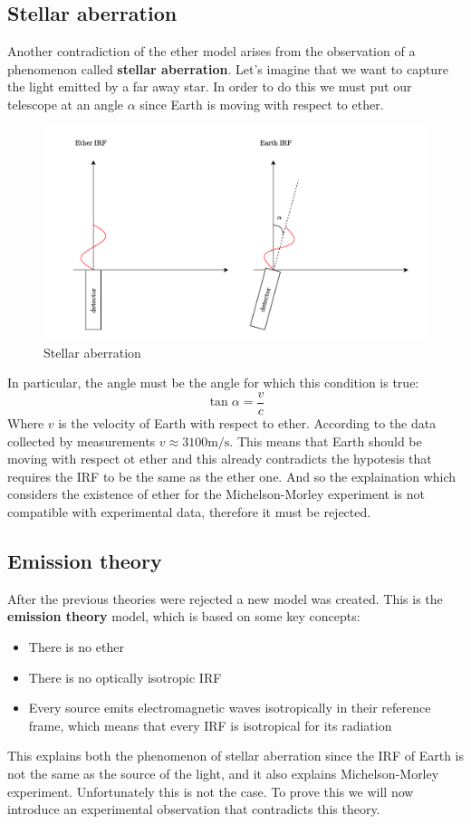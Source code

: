 \subsection{Stellar aberration}
Another contradiction of the ether model arises from the observation of a phenomenon called \textbf{stellar aberration}. Let's imagine that we want to capture the light emitted by a far away star. In order to do this we must put our telescope at an angle $\alpha$ since Earth is moving with respect to ether.
\begin{figure}[H]
  \centering
  \includegraphics[width=0.6\linewidth]{res/svg/stellar_aberration.drawio}
  \caption{Stellar aberration}
\end{figure}
In particular, the angle must be the angle for which this condition is true:
\begin{equation}
  \tan \alpha = \dfrac{v}{c}
\end{equation}
Where $v$ is the velocity of Earth with respect to ether. According to the data collected by measurements $v \approx 3100 \unit{\meter / \second}$. This means that Earth should be moving with respect ot ether and this already contradicts the hypotesis that requires the IRF to be the same as the ether one. And so the explaination which considers the existence of ether for the Michelson-Morley experiment is not compatible with experimental data, therefore it must be rejected.
\subsection{Emission theory}
After the previous theories were rejected a new model was created. This is the \textbf{emission theory} model, which is based on some key concepts:
\begin{itemize}
  \item There is no ether
  \item There is no optically isotropic IRF
  \item Every source emits electromagnetic waves isotropically in their reference frame, which means that every IRF is isotropical for its radiation
\end{itemize}
This explains both the phenomenon of stellar aberration since the IRF of Earth is not the same as the source of the light, and it also explains Michelson-Morley experiment. Unfortunately this is not the case. To prove this we will now introduce an experimental observation that contradicts this theory.
